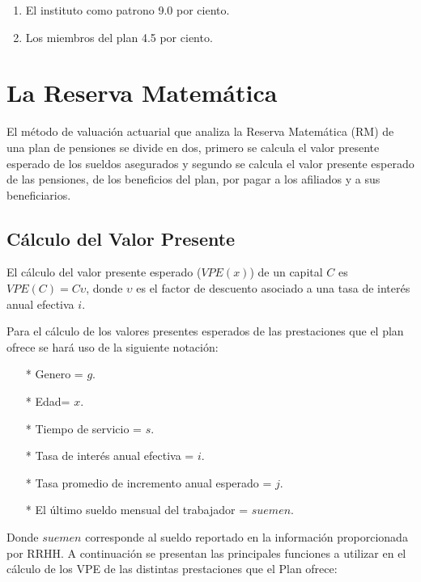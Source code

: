 \documentclass[12pt,letterpaper,titlepage]{article}
\begin{document}
\begin{enumerate}
	\item El instituto como patrono 9.0 por ciento.
	\item Los miembros del plan 4.5 por ciento.
\end{enumerate}

\newpage

\section{La Reserva Matemática}

El método de valuación actuarial que analiza la Reserva Matemática (RM) de una plan de pensiones se divide en dos, primero se calcula el valor presente esperado de los sueldos asegurados y segundo se calcula el valor presente esperado de las pensiones, de los beneficios del plan, por pagar a los afiliados y a sus beneficiarios.


\subsection{Cálculo del Valor Presente}

El cálculo del valor presente esperado ($V\!PE(x)$) de un capital $C$ es $V\!PE(C)=C\upsilon$, donde $\upsilon$ es el factor de descuento asociado a una tasa de interés anual efectiva $i$.

Para el cálculo de los valores presentes esperados de las prestaciones que el plan ofrece se hará uso de la siguiente notación:

\begin{itemize}
	\item [*] Genero = $g$.
	\item [*] Edad= $x$.
	\item [*] Tiempo de servicio = $s$.
	\item [*] Tasa de interés anual efectiva = $i$.
	\item [*] Tasa promedio de incremento anual esperado = $j$.
	\item [*] El último sueldo mensual del trabajador = $suemen$.
\end{itemize}

Donde $suemen$ corresponde al sueldo reportado en la información proporcionada por RRHH. A continuación se presentan las principales funciones a utilizar en el cálculo de los VPE de las distintas prestaciones que el Plan ofrece: 
\end{document}
